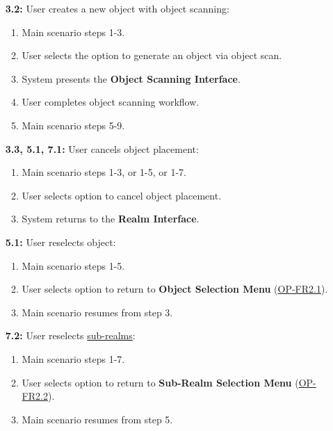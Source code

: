 \documentclass{article}
\begin{document}
\begin{enumerate}[label=\textbf{UC\arabic*}]
\begin{itemize}
              \item[{\bf 3.2:}] User creates a new object with object scanning:
                    \begin{enumerate}[label=\textbf{\arabic*.}]
                        \item Main scenario steps 1-3.
                        \item User selects the option to generate an object via object scan.
                        \item System presents the \textbf{Object Scanning Interface}.
                        \item User completes object scanning workflow.
                        \item Main scenario steps 5-9.
                    \end{enumerate}

              \item[{\bf 3.3, 5.1, 7.1:}] User cancels object placement:
                    \begin{enumerate}[label=\textbf{\arabic*.}]
                        \item Main scenario steps 1-3, or 1-5, or 1-7.
                        \item User selects option to cancel object placement.
                        \item System returns to the \textbf{Realm Interface}.
                    \end{enumerate}

              \item[{\bf 5.1:}] User reselects object:
                    \begin{enumerate}[label=\textbf{\arabic*.}]
                        \item Main scenario steps 1-5.
                        \item User selects option to return to \textbf{Object Selection Menu} (\hyperref[ssub:object_placement]{OP-FR2.1}).
                        \item Main scenario resumes from step 3.
                    \end{enumerate}

              \item[{\bf 7.2:}] User reselects \hyperref[def:sub_realm]{sub-realms}:
                    \begin{enumerate}[label=\textbf{\arabic*.}]
                        \item Main scenario steps 1-7.
                        \item User selects option to return to \textbf{Sub-Realm Selection Menu} (\hyperref[ssub:object_placement]{OP-FR2.2}).
                        \item Main scenario resumes from step 5.
                    \end{enumerate}
          \end{itemize}


\end{enumerate}
\end{document}
